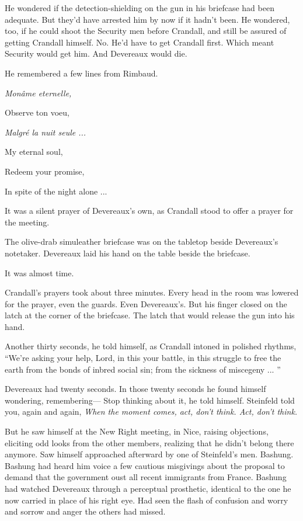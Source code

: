 He wondered if the detection-shielding on the gun in his briefcase had been adequate. But they'd have arrested him by now if it hadn't been. He wondered, too, if he could shoot the Security men before Crandall, and still be assured of getting Crandall himself. No. He'd have to get Crandall first. Which meant Security would get him. And Devereaux would die.

He remembered a few lines from Rimbaud.

\textit{Monâme eternelle,}

Observe ton voeu,

\textit{Malgré la nuit seule ...}

My eternal soul,

Redeem your promise,

In spite of the night alone ...

It was a silent prayer of Devereaux's own, as Crandall stood to offer a prayer for the meeting.

The olive-drab simuleather briefcase was on the tabletop beside Devereaux's notetaker. Devereaux laid his hand on the table beside the briefcase.

It was almost time.

Crandall's prayers took about three minutes. Every head in the room was lowered for the prayer, even the guards. Even Devereaux's. But his finger closed on the latch at the corner of the briefcase. The latch that would release the gun into his hand.

Another thirty seconds, he told himself, as Crandall intoned in polished rhythms, ``We're asking your help, Lord, in this your battle, in this struggle to free the earth from the bonds of inbred social sin; from the sickness of miscegeny ... ''

Devereaux had twenty seconds. In those twenty seconds he found himself wondering, remembering--- Stop thinking about it, he told himself. Steinfeld told you, again and again, \textit{When the moment comes, act, don't think. Act, don't think.}

But he saw himself at the New Right meeting, in Nice, raising objections, eliciting odd looks from the other members, realizing that he didn't belong there anymore. Saw himself approached afterward by one of Steinfeld's men. Bashung. Bashung had heard him voice a few cautious misgivings about the proposal to demand that the government oust all recent immigrants from France. Bashung had watched Devereaux through a perceptual prosthetic, identical to the one he now carried in place of his right eye. Had seen the flash of confusion and worry and sorrow and anger the others had missed.

